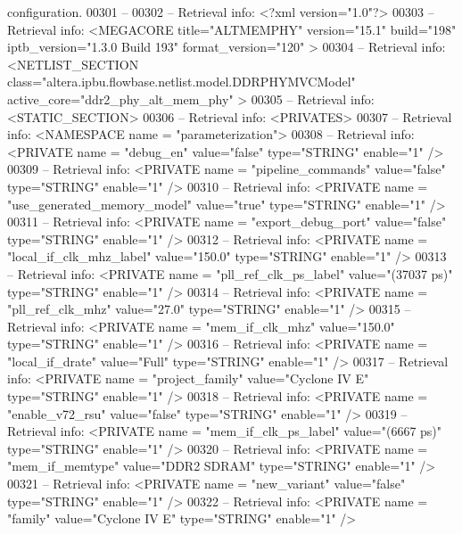 \begin{DoxyCode}
{{       configuration.}
00301 \textcolor{keyword}{-- }
00302 \textcolor{keyword}{-- Retrieval info: <?xml version="1.0"?>}
00303 \textcolor{keyword}{-- Retrieval info: <MEGACORE title="ALTMEMPHY"  version="15.1"  build="198"  iptb\_version="1.3.0 Build 193"
        format\_version="120" >}
00304 \textcolor{keyword}{-- Retrieval info:  <NETLIST\_SECTION class="altera.ipbu.flowbase.netlist.model.DDRPHYMVCModel" 
       active\_core="ddr2\_phy\_alt\_mem\_phy" >}
00305 \textcolor{keyword}{-- Retrieval info:   <STATIC\_SECTION>}
00306 \textcolor{keyword}{-- Retrieval info:    <PRIVATES>}
00307 \textcolor{keyword}{-- Retrieval info:     <NAMESPACE name = "parameterization">}
00308 \textcolor{keyword}{-- Retrieval info:      <PRIVATE name = "debug\_en" value="false"  type="STRING"  enable="1" />}
00309 \textcolor{keyword}{-- Retrieval info:      <PRIVATE name = "pipeline\_commands" value="false"  type="STRING"  enable="1" />}
00310 \textcolor{keyword}{-- Retrieval info:      <PRIVATE name = "use\_generated\_memory\_model" value="true"  type="STRING" 
       enable="1" />}
00311 \textcolor{keyword}{-- Retrieval info:      <PRIVATE name = "export\_debug\_port" value="false"  type="STRING"  enable="1" />}
00312 \textcolor{keyword}{-- Retrieval info:      <PRIVATE name = "local\_if\_clk\_mhz\_label" value="150.0"  type="STRING"  enable="1"
       />}
00313 \textcolor{keyword}{-- Retrieval info:      <PRIVATE name = "pll\_ref\_clk\_ps\_label" value="(37037 ps)"  type="STRING" 
       enable="1" />}
00314 \textcolor{keyword}{-- Retrieval info:      <PRIVATE name = "pll\_ref\_clk\_mhz" value="27.0"  type="STRING"  enable="1" />}
00315 \textcolor{keyword}{-- Retrieval info:      <PRIVATE name = "mem\_if\_clk\_mhz" value="150.0"  type="STRING"  enable="1" />}
00316 \textcolor{keyword}{-- Retrieval info:      <PRIVATE name = "local\_if\_drate" value="Full"  type="STRING"  enable="1" />}
00317 \textcolor{keyword}{-- Retrieval info:      <PRIVATE name = "project\_family" value="Cyclone IV E"  type="STRING"  enable="1" />}
00318 \textcolor{keyword}{-- Retrieval info:      <PRIVATE name = "enable\_v72\_rsu" value="false"  type="STRING"  enable="1" />}
00319 \textcolor{keyword}{-- Retrieval info:      <PRIVATE name = "mem\_if\_clk\_ps\_label" value="(6667 ps)"  type="STRING"  enable="1"
       />}
00320 \textcolor{keyword}{-- Retrieval info:      <PRIVATE name = "mem\_if\_memtype" value="DDR2 SDRAM"  type="STRING"  enable="1" />}
00321 \textcolor{keyword}{-- Retrieval info:      <PRIVATE name = "new\_variant" value="false"  type="STRING"  enable="1" />}
00322 \textcolor{keyword}{-- Retrieval info:      <PRIVATE name = "family" value="Cyclone IV E"  type="STRING"  enable="1" />}
}
\end{DoxyCode}
